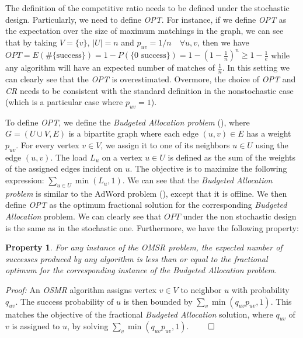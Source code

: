 \documentclass[12pt, twocolumn]{article}
\newtheorem{property}{Property}
\begin{document}
\par
\hspace{\parindent}The definition of the competitive ratio needs to be defined under the stochastic design. Particularly, we need to define \textit{OPT}. For instance, if we define \textit{OPT} as the expectation
over the size of maximum matchings in the graph, we can see that by taking $V = \{v\}$, $|U|=n$ and $p_{uv}=1/n \quad \forall u,v$, then we have $OPT = E(\#\{\text{success}\})= 1 - P(\{\text{0 success}\}) =  1-\left( 1- \frac{1}{n}\right)^n \geq 1-\frac{1}{e}$ while any algorithm will have an expected number of matches of $\frac{1}{n}$. In this setting we can clearly see that the \textit{OPT} is overestimated. Overmore, the choice of \textit{OPT} and \textit{CR} needs to be consistent with the standard definition in the nonstochastic case (which is a particular case where $p_{uv}=1$).
\par
\hspace{\parindent}To define \textit{OPT}, we define the \textit{Budgeted Allocation problem} (\cite{Srinivasan2008}), where \( G = (U \cup V, E) \) is a bipartite graph where each edge \( (u, v) \in E \) has a weight \( p_{uv} \). For every vertex \( v \in V \), we assign it to one of its neighbors \( u \in U \) using the edge \( (u, v) \). The load \( L_u \) on a vertex \( u \in U \) is defined as the sum of the weights of the assigned edges incident on \( u \). The objective is to maximize the following expression:
$\sum_{u \in U} \min(L_u, 1)$. We can see that the \textit{Budgeted Allocation problem} is similar to the AdWord problem (\cite{mehta2007}), except that it is offline. We then define \textit{OPT} as the optimum
fractional solution for the corresponding \textit{Budgeted Allocation} problem. We can clearly see that $OPT$ under the non stochastic design is the same as in the stochastic one. Furthermore, we have the following property:

\begin{property}
    For any instance of the OMSR problem, the expected number of successes produced by any algorithm is less than or equal to the fractional optimum for the corresponding instance of the \textit{Budgeted Allocation} problem.

\end{property}

\textit{Proof:} An \textit{OSMR} algorithm assigns vertex $v \in V$ to neighbor $u$ with probability $q_{uv}$. The success probability of $u$ is then bounded by $\sum_{v} \min\left(q_{uv} p_{uv}, 1\right)$. This matches the objective of the fractional \textit{Budgeted Allocation} solution, where $q_{uv}$ of $v$ is assigned to $u$, by solving $\sum_{v} \min\left(q_{uv} p_{uv}, 1\right)$. $\qed$
\end{document}
